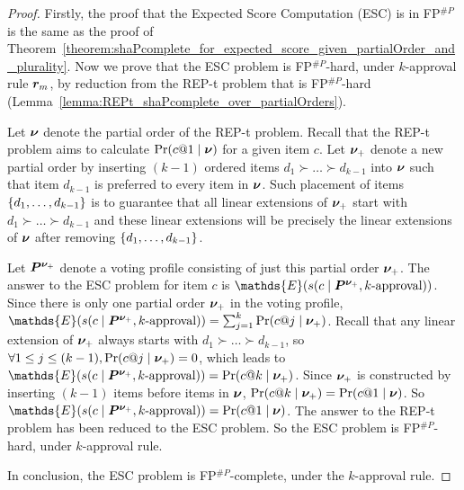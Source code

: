 \begin{proof}
    Firstly, the proof that the Expected Score Computation (ESC) is in FP$^{\#P}$ is the same as the proof of Theorem~\ref{theorem:shaPcomplete_for_expected_score_given_partialOrder_and_plurality}.
    Now we prove that the ESC problem is FP$^{\#P}$-hard, under $k$-approval rule $\vr_m$, by reduction from the REP-t problem that is FP$^{\#P}$-hard (Lemma~\ref{lemma:REPt_shaPcomplete_over_partialOrders}).
    
    Let $\partialOrder$ denote the partial order of the REP-t problem.
    Recall that the REP-t problem aims to calculate $\Pr(c@1 \mid \partialOrder)$ for a given item $c$.
    Let $\partialOrder_+$ denote a new partial order by inserting $(k - 1)$ ordered items $d_1 \succ \ldots \succ d_{k-1}$ into $\partialOrder$ such that item $d_{k-1}$ is preferred to every item in $\partialOrder$.
    Such placement of items $\set{\enum[k-1]{d}}$ is to guarantee that all linear extensions of $\partialOrder_+$ start with $d_1 \succ \ldots \succ d_{k-1}$ and these linear extensions will be precisely the linear extensions of $\partialOrder$ after removing $\set{\enum[k-1]{d}}$.
    
    Let $\VP^{\partialOrder_+}$ denote a voting profile consisting of just this partial order $\partialOrder_+$.
    The answer to the ESC problem for item $c$ is $\mathds{E}(\score(c \mid \VP^{\partialOrder_+}, k\text{-approval}))$.
    Since there is only one partial order $\partialOrder_+$ in the voting profile, $\mathds{E}(\score(c \mid \VP^{\partialOrder_+}, k\text{-approval})) = \sum_{j=1}^{k} \Pr(c@j \mid \partialOrder_+)$.
    Recall that any linear extension of $\partialOrder_+$ always starts with $d_1 \succ \ldots \succ d_{k-1}$, so $\forall 1 \leq j \leq (k-1), \Pr(c@j \mid \partialOrder_+) = 0$, which leads to $\mathds{E}(\score(c \mid \VP^{\partialOrder_+}, k\text{-approval})) = \Pr(c@k \mid \partialOrder_+)$.
    Since $\partialOrder_+$ is constructed by inserting $(k-1)$ items before items in $\partialOrder$, $\Pr(c@k \mid \partialOrder_+) = \Pr(c@1 \mid \partialOrder)$.
    So $\mathds{E}(\score(c \mid \VP^{\partialOrder_+}, k\text{-approval})) = \Pr(c@1 \mid \partialOrder)$.
    The answer to the REP-t problem has been reduced to the ESC problem.
    So the ESC problem is FP$^{\#P}$-hard, under $k$-approval rule.
    
    In conclusion, the ESC problem is FP$^{\#P}$-complete, under the $k$-approval rule.
\end{proof}


